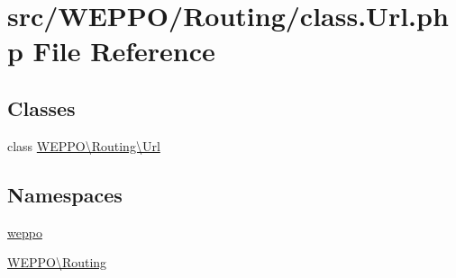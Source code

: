 \hypertarget{class_8Url_8php}{}\section{src/\+W\+E\+P\+P\+O/\+Routing/class.Url.\+php File Reference}
\label{class_8Url_8php}
\subsection*{Classes}
\begin{DoxyCompactItemize}
\item 
class \hyperlink{classWEPPO_1_1Routing_1_1Url}{W\+E\+P\+P\+O\textbackslash{}\+Routing\textbackslash{}\+Url}
\end{DoxyCompactItemize}
\subsection*{Namespaces}
\begin{DoxyCompactItemize}
\item 
 \hyperlink{namespaceweppo}{weppo}
\item 
 \hyperlink{namespaceWEPPO_1_1Routing}{W\+E\+P\+P\+O\textbackslash{}\+Routing}
\end{DoxyCompactItemize}
